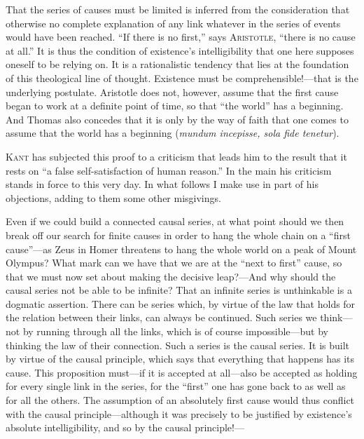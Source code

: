 \documentclass[12pt,a4paper]{book}
\newcommand{\opage}[1]{\marginnote{\footnotesize\textit{[#1]}}}
\begin{document}
That the series of causes must be limited is inferred from the
consideration that otherwise no complete explanation of any link
whatever in the series of events would have been reached. ``If there is
no first,'' says \textsc{Aristotle}, ``there is no cause at all.'' It is
thus the condition of existence's intelligibility that one here supposes
oneself to be relying on. It is a rationalistic tendency that lies at
the foundation of this theological line of thought. Existence must be
comprehensible!---that is the underlying postulate. Aristotle does not,
however, assume that the first cause began to work at a definite point
of time, so that ``the world'' has a beginning. And Thomas also concedes
that it is only by the way of faith that one comes to assume that the
world has a beginning (\textit{mundum incepisse, sola fide tenetur}).

\textsc{Kant} has subjected this proof to a criticism that leads him to
the result that it rests on ``a false self-satisfaction of human
reason.'' In the main his criticism stands in force to this very day. In
what follows I make use in part of his objections, adding to them some
other misgivings.

Even if we could build a connected causal series, at what point should
we then break off our search for finite causes in order to hang the
whole chain on a ``first cause''---as Zeus in Homer threatens to hang the
whole world on a peak of Mount Olympus? What mark can we have that we
are 
\opage{23}at the ``next to first'' cause, so that we must now set about making
the decisive leap?---And why should the causal series not be able to be
infinite? That an infinite series is unthinkable is a dogmatic
assertion. There can be series which, by virtue of the law that holds
for the relation between their links, can always be continued. Such
series we think---not by running through all the links, which is of
course impossible---but by thinking the law of their connection. Such a
series is the causal series. It is built by virtue of the causal
principle, which says that everything that happens has its cause. This
proposition must---if it is accepted at all---also be accepted as
holding for every single link in the series, for the ``first'' one has
gone back to as well as for all the others. The assumption of an
absolutely first cause would thus conflict with the causal
principle---although it was precisely to be justified by existence's
absolute intelligibility, and so by the causal principle!---
\end{document}
